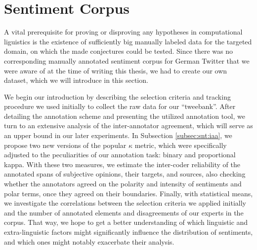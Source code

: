 

\section{Sentiment Corpus}\label{sec:snt:corpus}

A vital prerequisite for proving or disproving any hypotheses in
computational liguistics is the existence of sufficiently big manually
labeled data for the targeted domain, on which the made conjectures
could be tested.  Since there was no corresponding manually annotated
sentiment corpus for German Twitter that we were aware of at the time
of writing this thesis, we had to create our own dataset, which we
will introduce in this section.

We begin our introduction by describing the selection criteria and
tracking procedure we used initially to collect the raw data for our
``tweebank''.  After detailing the annotation scheme and presenting
the utilized annotation tool, we turn to an extensive analysis of the
inter-annotator agreement, which will serve as an upper bound in our
later experiments.  In Subsection \ref{subsec:snt:iaa}, we propose two
new versions of the popular $\kappa$ metric, which were specifically
adjusted to the peculiarities of our annotation task: binary and
proportional kappa.  With these two measures, we estimate the
inter-coder reliability of the annotated spans of subjective opinions,
their targets, and sources, also checking whether the annotators
agreed on the polarity and intensity of sentiments and polar terms,
once they agreed on their boundaries.  Finally, with statistical
means, we investigate the correlations between the selection criteria
we applied initially and the number of annotated elements and
disagreements of our experts in the corpus.  That way, we hope to get
a better understanding of which linguistic and extra-linguistic
factors might significantly influence the distribution of sentiments,
and which ones might notably exacerbate their analysis.

